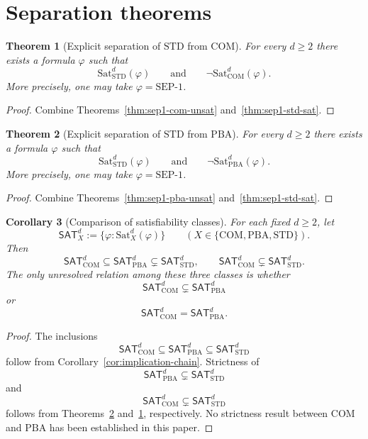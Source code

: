 \documentclass[11pt]{article}
\theoremstyle{plain}
\newtheorem{theorem}{Theorem}[section]
\newtheorem{corollary}[theorem]{Corollary}
\theoremstyle{definition}
\newcommand{\STD}{\mathrm{STD}}
\newcommand{\COM}{\mathrm{COM}}
\newcommand{\PBA}{\mathrm{PBA}}
\newcommand{\Sat}{\mathrm{Sat}}
\newcommand{\SEPone}{\mathrm{SEP}\text{-}1}
\begin{document}
\section{Separation theorems}

\begin{theorem}[Explicit separation of \(\STD\) from \(\COM\)]\label{thm:std-not-implies-com}
For every $d\geq 2$ there exists a formula $\varphi$ such that
\[
\Sat_{\STD}^d(\varphi)
\qquad\text{and}\qquad
\neg\Sat_{\COM}^d(\varphi).
\]
More precisely, one may take $\varphi=\SEPone$.
\end{theorem}

\begin{proof}
Combine Theorems~\ref{thm:sep1-com-unsat} and~\ref{thm:sep1-std-sat}.
\end{proof}

\begin{theorem}[Explicit separation of \(\STD\) from \(\PBA\)]\label{thm:std-not-implies-pba}
For every $d\geq 2$ there exists a formula $\varphi$ such that
\[
\Sat_{\STD}^d(\varphi)
\qquad\text{and}\qquad
\neg\Sat_{\PBA}^d(\varphi).
\]
More precisely, one may take $\varphi=\SEPone$.
\end{theorem}

\begin{proof}
Combine Theorems~\ref{thm:sep1-pba-unsat} and~\ref{thm:sep1-std-sat}.
\end{proof}

\begin{corollary}[Comparison of satisfiability classes]\label{cor:comparison-classes}
For each fixed $d\geq 2$, let
\[
\mathsf{SAT}_{X}^d := \{\varphi : \Sat_X^d(\varphi)\}
\qquad (X\in\{\COM,\PBA,\STD\}).
\]
Then
\[
\mathsf{SAT}_{\COM}^d \subseteq \mathsf{SAT}_{\PBA}^d \subsetneq \mathsf{SAT}_{\STD}^d,
\qquad
\mathsf{SAT}_{\COM}^d \subsetneq \mathsf{SAT}_{\STD}^d.
\]
The only unresolved relation among these three classes is whether
\[
\mathsf{SAT}_{\COM}^d \subsetneq \mathsf{SAT}_{\PBA}^d
\]
or
\[
\mathsf{SAT}_{\COM}^d = \mathsf{SAT}_{\PBA}^d.
\]
\end{corollary}

\begin{proof}
The inclusions
\[
\mathsf{SAT}_{\COM}^d \subseteq \mathsf{SAT}_{\PBA}^d \subseteq \mathsf{SAT}_{\STD}^d
\]
follow from Corollary~\ref{cor:implication-chain}.
Strictness of
\[
\mathsf{SAT}_{\PBA}^d \subsetneq \mathsf{SAT}_{\STD}^d
\]
and
\[
\mathsf{SAT}_{\COM}^d \subsetneq \mathsf{SAT}_{\STD}^d
\]
follows from Theorems~\ref{thm:std-not-implies-pba} and~\ref{thm:std-not-implies-com}, respectively.
No strictness result between $\COM$ and $\PBA$ has been established in this paper.
\end{proof}
\end{document}
